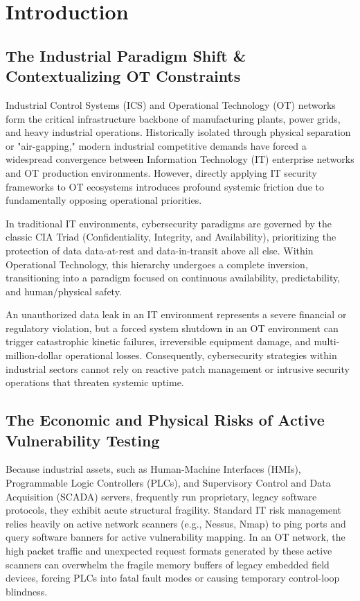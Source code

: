 \documentclass[target=mst,aauheader=aics,style=]{thud}
\begin{document}
\tableofcontents

\mainmatter

\chapter{Introduction}

\section{The Industrial Paradigm Shift \& Contextualizing OT Constraints}
Industrial Control Systems (ICS) and Operational Technology (OT) networks form the critical infrastructure backbone of manufacturing plants, power grids, and heavy industrial operations. Historically isolated through physical separation or "air-gapping," modern industrial competitive demands have forced a widespread convergence between Information Technology (IT) enterprise networks and OT production environments. However, directly applying IT security frameworks to OT ecosystems introduces profound systemic friction due to fundamentally opposing operational priorities.

In traditional IT environments, cybersecurity paradigms are governed by the classic CIA Triad (Confidentiality, Integrity, and Availability), prioritizing the protection of data data-at-rest and data-in-transit above all else. Within Operational Technology, this hierarchy undergoes a complete inversion, transitioning into a paradigm focused on continuous availability, predictability, and human/physical safety.

An unauthorized data leak in an IT environment represents a severe financial or regulatory violation, but a forced system shutdown in an OT environment can trigger catastrophic kinetic failures, irreversible equipment damage, and multi-million-dollar operational losses. Consequently, cybersecurity strategies within industrial sectors cannot rely on reactive patch management or intrusive security operations that threaten systemic uptime. 

\section{The Economic and Physical Risks of Active Vulnerability Testing}
Because industrial assets, such as Human-Machine Interfaces (HMIs), Programmable Logic Controllers (PLCs), and Supervisory Control and Data Acquisition (SCADA) servers, frequently run proprietary, legacy software protocols, they exhibit acute structural fragility. Standard IT risk management relies heavily on active network scanners (e.g., Nessus, Nmap) to ping ports and query software banners for active vulnerability mapping. In an OT network, the high packet traffic and unexpected request formats generated by these active scanners can overwhelm the fragile memory buffers of legacy embedded field devices, forcing PLCs into fatal fault modes or causing temporary control-loop blindness.
\end{document}
